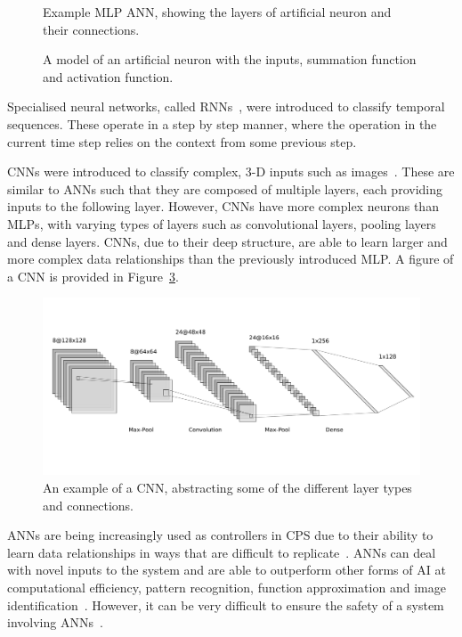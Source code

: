 \begin{figure}[h]
	\centering
	\scalebox{0.8}{}
	\caption{Example \ac{MLP} \ac{ANN}, showing the layers of artificial neuron and their connections.	\label{fig:mlp-ann}}
\end{figure}
\begin{figure}[h]
	\centering
	\scalebox{0.8}{}
	\caption{A model of an artificial neuron with the inputs, summation function and activation function. \label{fig:artificial-neuron}}
\end{figure}

Specialised neural networks, called \acfp{RNN}~\cite{medsker2001recurrent}, were introduced to classify temporal sequences. 
These operate in a step by step manner, where the operation in the current time step relies on the context from some previous step.

\acp{CNN} were introduced to classify complex, 3-D inputs such as images~\cite{grad-desc}.
These are similar to \acp{ANN} such that they are composed of multiple layers, each providing inputs to the following layer. 
However, \acp{CNN} have more complex neurons than \acp{MLP}, with varying types of layers such as convolutional layers, pooling layers and dense layers.
\acp{CNN}, due to their deep structure, are able to learn larger and more complex data relationships than the previously introduced \ac{MLP}.
A figure of a \ac{CNN} is provided in Figure~\ref{fig:cnn}.

\begin{figure}[h]
	\centering
	\includegraphics[width=\textwidth]{Content/fig/cnn-img.pdf}
	\caption{An example of a \ac{CNN}, abstracting some of the different layer types and connections. \label{fig:cnn}}
\end{figure}

\acp{ANN} are being increasingly used as controllers in \ac{CPS} due to their ability to learn data relationships in ways that are difficult to replicate~\cite{ANNSafety2007}. 
\acp{ANN} can deal with novel inputs to the system and are able to outperform other forms of \ac{AI} at computational efficiency, pattern recognition, function approximation and image identification~\cite{AIComp2016, AIComp2017}. 
However, it can be very difficult to ensure the safety of a system involving \acp{ANN}~\cite{ANNSafety2007, ANNSafety2018}.

